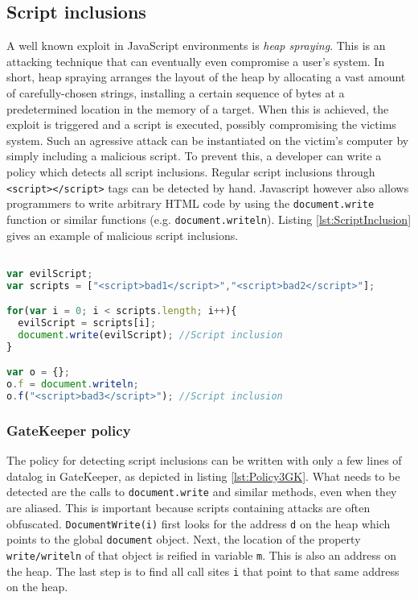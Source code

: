 \subsection{Script inclusions}
\label{subsec:ScriptInclusion}


A well known exploit in JavaScript environments is \textit{heap spraying}\cite{HeapSpraying}. This is an attacking technique that can eventually even compromise a user's system. In short, heap spraying arranges the layout of the heap by allocating a vast amount of carefully-chosen strings, installing a certain sequence of bytes at a predetermined location in the memory of a target. When this is achieved, the exploit is triggered and a script is executed, possibly compromising the victims system. Such an agressive attack can be instantiated on the victim's computer by simply including a malicious script. To prevent this, a developer can write a policy which detects all script inclusions. Regular script inclusions through \texttt{<script></script>} tags can be detected by hand. Javascript however also allows programmers to write arbitrary HTML code by using the \texttt{document.write} function or similar functions (e.g. \texttt{document.writeln}). Listing \ref{lst:ScriptInclusion} gives an example of malicious script inclusions.

\begin{lstlisting}[label={lst:ScriptInclusion},language=JavaScript,caption=Script inclusion example,mathescape=true]  % float=t?

var evilScript;
var scripts = ["<script>bad1</script>","<script>bad2</script>"];

for(var i = 0; i < scripts.length; i++){
  evilScript = scripts[i];
  document.write(evilScript); //Script inclusion
}

var o = {};
o.f = document.writeln;
o.f("<script>bad3</script>"); //Script inclusion
\end{lstlisting}

\subsubsection*{GateKeeper policy}

The policy for detecting script inclusions can be written with only a few lines of datalog in GateKeeper, as depicted in listing \ref{lst:Policy3GK}. What needs to be detected are the calls to \texttt{document.write} and similar methods, even when they are aliased. This is important because scripts containing attacks are often obfuscated. \texttt{DocumentWrite(i)} first looks for the address \texttt{d} on the heap which points to the global \texttt{document} object. Next, the location of the property \texttt{write/writeln} of that object is reified in variable \texttt{m}. This is also an address on the heap. The last step is to find all call sites \texttt{i} that point to that same address on the heap. 

